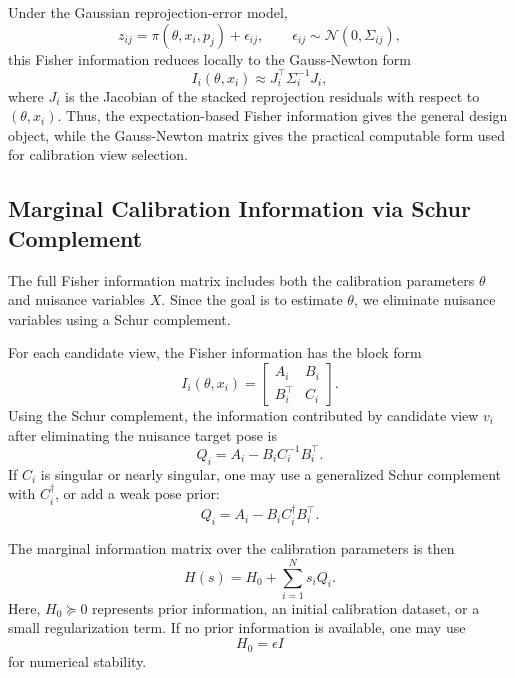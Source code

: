 \documentclass[letterpaper, 9
 pt, conference]{ieeeconf}
\begin{document}
Under the Gaussian reprojection-error model,
\begin{equation}
    z_{ij}
    =
    \pi(\theta,x_i,p_j)+\epsilon_{ij},
    \qquad
    \epsilon_{ij}\sim\mathcal{N}(0,\Sigma_{ij}),
\end{equation}
this Fisher information reduces locally to the Gauss-Newton form
\begin{equation}
    I_i(\theta,x_i)
    \approx
    J_i^\top \Sigma_i^{-1}J_i,
\end{equation}
where $J_i$ is the Jacobian of the stacked reprojection residuals with respect to $(\theta,x_i)$. Thus, the expectation-based Fisher information gives the general design object, while the Gauss-Newton matrix gives the practical computable form used for calibration view selection.

\subsection{Marginal Calibration Information via Schur Complement}
\label{subsec:schur_information}

The full Fisher information matrix includes both the calibration parameters $\theta$ and nuisance variables $X$. Since the goal is to estimate $\theta$, we eliminate nuisance variables using a Schur complement.

For each candidate view, the Fisher information has the block form
\begin{equation}
    I_i(\theta,x_i)
    =
    \begin{bmatrix}
        A_i & B_i\\
        B_i^\top & C_i
    \end{bmatrix}.
\end{equation}
Using the Schur complement, the information contributed by candidate view $v_i$ after eliminating the nuisance target pose is
\begin{equation}
    Q_i
    =
    A_i
    -
    B_iC_i^{-1}B_i^\top.
\end{equation}
If $C_i$ is singular or nearly singular, one may use a generalized Schur complement with $C_i^\dagger$, or add a weak pose prior:
\begin{equation}
    Q_i
    =
    A_i
    -
    B_iC_i^{\dagger}B_i^\top.
\end{equation}

The marginal information matrix over the calibration parameters is then
\begin{equation}
    H(s)
    =
    H_0
    +
    \sum_{i=1}^{N}
    s_iQ_i.
\end{equation}
Here, $H_0\succeq 0$ represents prior information, an initial calibration dataset, or a small regularization term. If no prior information is available, one may use
\begin{equation}
    H_0=\epsilon I
\end{equation}
for numerical stability.
\end{document}

